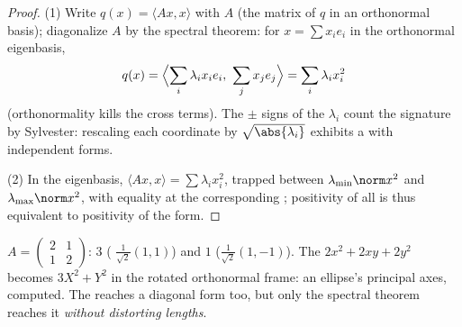 \begin{proof}
(1) Write $q(x) = \langle A x, x\rangle$ with $A$  (the
matrix of $q$ in an orthonormal basis); diagonalize $A$ by the
spectral theorem: for $x = \sum x_ie_i$ in the orthonormal
eigenbasis,
\[
q(x) = \Bigl\langle \sum_i \lambda_ix_ie_i,\ \sum_j
x_je_j\Bigr\rangle = \sum_i \lambda_i x_i^2
\]
(orthonormality kills the cross terms). The $\pm$ signs of the
$\lambda_i$ count the signature by Sylvester: rescaling each
coordinate by $\sqrt{\abs{\lambda_i}}$ exhibits a  with independent forms.

(2) In the eigenbasis, $\langle Ax, x\rangle = \sum \lambda_i
x_i^2$, trapped between $\lambda_{\min}\norm x^2$ and
$\lambda_{\max}\norm x^2$, with equality at the corresponding
; positivity of all  is thus equivalent
to positivity of the form.
\end{proof}

\begin{example}\label{ex:b2:quadratic:spectralexample}
$A = \begin{pmatrix} 2 & 1\\ 1 & 2 \end{pmatrix}$:  $3$
( $\frac{1}{\sqrt2}(1,1)$) and $1$
($\frac{1}{\sqrt2}(1,-1)$). The  $2x^2 + 2xy + 2y^2$
becomes $3X^2 + Y^2$ in the rotated orthonormal frame: an ellipse's
principal axes, computed. The  reaches a diagonal
form too, but only the spectral theorem reaches it \emph{without
distorting lengths}.
\end{example}

